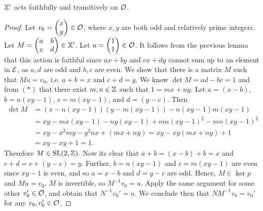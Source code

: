\documentclass[]{article}
\begin{document}
\begin{lem}
$\mathbb{X}'$ acts faithfully and transitively on $\mathcal{O}$.
\begin{proof}
Let $v_0=\begin{pmatrix}x \\ y\end{pmatrix}\in\mathcal{O}$, where $x,y$ are both odd and relatively prime integers. Let $M=\begin{pmatrix}a & b \\ c & d
\end{pmatrix}\in\mathbb{X}'$. Let $u=\begin{pmatrix}1 \\ 1 \end{pmatrix}\in\mathcal{O}$. It follows from the previous lemma that this action is faithful since $ax+by$ and $cx+dy$ cannot sum up to an element in $\mathcal{E}$, as $a,d$ are odd and $b,c$ are even. We show that there is a matrix $M$ such that $Mu=v_0$, i.e. $a+b=x$ and $c+d=y$. We know $\det M=ad-bc=1$ and from $(*)$ that there exist $m,n\in\mathbb{Z}$ such that $1=mx+ny$. Let $a=(x-b)$, $b=n(xy-1)$, $c=m(xy-1)$, and $d=(y-c)$. Then
\begin{align*}
\det M&=(x-n(xy-1))(y-m(xy-1))-n(xy-1)m(xy-1)\\
&=xy-mx(xy-1)-ny(xy-1)+mn(xy-1)^2-mn(xy-1)^2\\
&=xy-x^2my-y^2nx+(mx+ny)=xy-xy(mx+ny)+1\\
&=xy-xy+1=1.
\end{align*}
Therefore $M\in\mathrm{SL}(2,\mathbb{Z})$. Now its clear that $a+b=(x-b)+b=x$ and $c+d=c+(y-c)=y$. Further, $b=n(xy-1)$ and $c=m(xy-1)$ are even since $xy-1$ is even, and so $a=x-b$ and $d=y-c$ are odd. Hence, $M\in\ker p$ and $Mu=v_0$. $M$ is invertible, so $M^{-1}v_0=u.$ Apply the same argument for some other $v_0'\in\mathcal{O}$, and obtain that $N^{-1}v_0'=u.$ We conclude then that $NM^{-1}v_0=v_0'$ for any $v_0,v_0'\in\mathcal{O}$.
\end{proof}
\end{lem}
\end{document}
